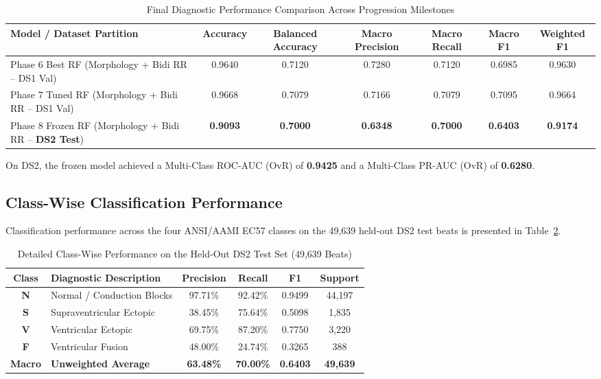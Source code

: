 \documentclass[conference]{IEEEtran}
\begin{document}
\begin{table}[t]
\centering
\caption{Final Diagnostic Performance Comparison Across Progression Milestones}
\label{tab:final_performance}
\begin{tabular}{lcccccc}
\hline
\textbf{Model / Dataset Partition} & \textbf{Accuracy} & \textbf{Balanced Accuracy} & \textbf{Macro Precision} & \textbf{Macro Recall} & \textbf{Macro F1} & \textbf{Weighted F1} \\
\hline
Phase 6 Best RF (Morphology + Bidi RR -- DS1 Val) & 0.9640 & 0.7120 & 0.7280 & 0.7120 & 0.6985 & 0.9630 \\
Phase 7 Tuned RF (Morphology + Bidi RR -- DS1 Val) & 0.9668 & 0.7079 & 0.7166 & 0.7079 & 0.7095 & 0.9664 \\
Phase 8 Frozen RF (Morphology + Bidi RR -- \textbf{DS2 Test}) & \textbf{0.9093} & \textbf{0.7000} & \textbf{0.6348} & \textbf{0.7000} & \textbf{0.6403} & \textbf{0.9174} \\
\hline
\end{tabular}
\end{table}

On DS2, the frozen model achieved a Multi-Class ROC-AUC (OvR) of \textbf{0.9425} and a Multi-Class PR-AUC (OvR) of \textbf{0.6280}.

\subsection{Class-Wise Classification Performance}
Classification performance across the four ANSI/AAMI EC57 classes on the 49,639 held-out DS2 test beats is presented in Table~\ref{tab:classwise_ds2}.

\begin{table}[t]
\centering
\caption{Detailed Class-Wise Performance on the Held-Out DS2 Test Set (49,639 Beats)}
\label{tab:classwise_ds2}
\begin{tabular}{clcccc}
\hline
\textbf{Class} & \textbf{Diagnostic Description} & \textbf{Precision} & \textbf{Recall} & \textbf{F1} & \textbf{Support} \\
\hline
\textbf{N} & Normal / Conduction Blocks & 97.71\% & 92.42\% & 0.9499 & 44,197 \\
\textbf{S} & Supraventricular Ectopic   & 38.45\% & 75.64\% & 0.5098 & 1,835 \\
\textbf{V} & Ventricular Ectopic        & 69.75\% & 87.20\% & 0.7750 & 3,220 \\
\textbf{F} & Ventricular Fusion         & 48.00\% & 24.74\% & 0.3265 & 388 \\
\hline
\textbf{Macro} & \textbf{Unweighted Average} & \textbf{63.48\%} & \textbf{70.00\%} & \textbf{0.6403} & \textbf{49,639} \\
\hline
\end{tabular}
\end{table}
\end{document}
